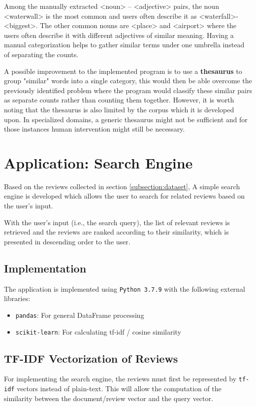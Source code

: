 \documentclass[sigconf,nonacm=true]{acmart}
\begin{document}
Among the manually extracted <noun> – <adjective> pairs, the noun <waterwall> is the most common and users often describe it as <waterfall>- <biggest>. The other common nouns are <place> and <airport> where the users often describe it with different adjectives of similar meaning. Having a manual categorization helps to gather similar terms under one umbrella instead of separating the counts.

A possible improvement to the implemented program is to use a \textbf{thesaurus} to group "similar" words into a single category, this would then be able overcome the previously identified problem where the program would classify these similar pairs as separate counts rather than counting them together. However, it is worth noting that the thesaurus is also limited by the corpus which it is developed upon. In specialized domains, a generic thesaurus might not be sufficient and for those instances human intervention might still be necessary.


\section{Application: Search Engine}
\label{section:label}
Based on the reviews collected in section \ref{subsection:dataset}, A simple search
engine is developed which allows the user to search for related reviews
based on the user's input.

With the user's input (i.e., the search query), the list
of relevant reviews is retrieved and the reviews are ranked according
to their similarity, which is presented in descending order to the user.

\subsection{Implementation}
The application is implemented using \verb|Python 3.7.9| with the following external
libraries:
\begin{itemize}
	\item {\verb|pandas|}: For general DataFrame processing
	\item {\verb|scikit-learn|}: For calculating tf-idf / cosine similarity
\end{itemize}


\subsection{TF-IDF Vectorization of Reviews}
For implementing the search engine, the reviews must first be represented by
\verb|tf-idf| vectors instead of plain-text. This will allow the computation
of the similarity between the document/review vector and the query vector.
\end{document}
